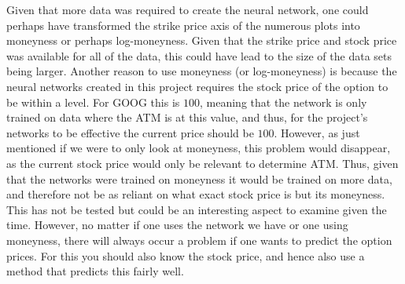 Given that more data was required to create the neural network, one could perhaps have transformed the strike price axis of the numerous plots into moneyness or perhaps log-moneyness. Given that the strike price and stock price was available for all of the data, this could have lead to the size of the data sets being larger. Another reason to use moneyness (or log-moneyness) is because the neural networks created in this project requires the stock price of the option to be within a level. For GOOG this is $100$, meaning that the network is only trained on data where the ATM is at this value, and thus, for the project's networks to be effective the current price should be $100$. However, as just mentioned if we were to only look at moneyness, this problem would disappear, as the current stock price would only be relevant to determine ATM. Thus, given that the networks were trained on moneyness it would be trained on more data, and therefore not be as reliant on what exact stock price is but its moneyness. This has not be tested but could be an interesting aspect to examine given the time. However, no matter if one uses the network we have or one using moneyness, there will always occur a problem if one wants to predict the option prices. For this you should also know the stock price, and hence also use a method that predicts this fairly well. 


